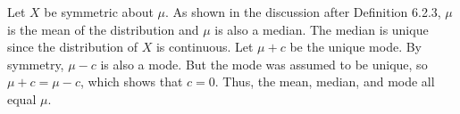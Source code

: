 
\setcounter{theorem}{9}
\begin{exercise} [BH.6.10]
\begin{solution}
    Let $X$ be symmetric about $\mu$. As shown in the discussion after Definition 6.2.3, $\mu$ is the mean of the distribution and $\mu$ is also a median. The median is unique since the distribution of $X$ is continuous. Let $\mu+c$ be the unique mode. By symmetry, $\mu-c$ is also a mode. But the mode was assumed to be unique, so $\mu+c=\mu-c$, which shows that $c=0$. Thus, the mean, median, and mode all equal $\mu$.
	
\end{solution}
\end{exercise}

